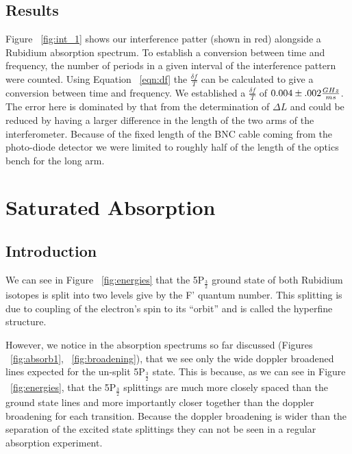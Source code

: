 \documentclass[paper=a4, fontsize=11pt]{scrartcl} %
\numberwithin{equation}{section}
\numberwithin{figure}{section}
\numberwithin{table}{section}
\begin{document}
\subsection{Results}


Figure ~\ref{fig:int_1} shows our interference patter (shown in red)
alongside a Rubidium absorption spectrum. To establish a conversion
between time and frequency, the number of periods in a given interval of
the interference pattern were counted. Using Equation ~\ref{eqn:df}
the $\frac{\delta f}{T}$ can be calculated to give a conversion
between time and frequency. We established a $\frac{\delta f}{T}$ of
$0.004 \pm .002\frac{\normalfont{GHz}}{\normalfont{ms}}$. The error
here is dominated by that from the determination of $\Delta L$ and
could be reduced by having a larger difference in the length of the
two arms of the interferometer. Because of the fixed length of the BNC
cable coming from the photo-diode detector we were limited to roughly
half of the length of the optics bench for the long arm.  
\section{Saturated Absorption}

\subsection{Introduction}
\label{sec:satabintro}
We can see in Figure ~\ref{fig:energies} that the 5P$_{\frac{3}{2}}$
ground state of both Rubidium isotopes is split into two levels give by the F' quantum
number. This splitting is due to coupling of the electron's spin to
its ``orbit'' and is called the hyperfine structure. 

However, we notice in the absorption spectrums so far discussed
(Figures ~\ref{fig:absorb1}, ~\ref{fig:broadening}), that we see only
the wide doppler broadened lines expected for the un-split
5P$_{\frac{3}{2}}$ state. This is because, as we can see in Figure
~\ref{fig:energies}, that the 5P$_{\frac{3}{2}}$ splittings are much
more closely spaced than the ground state lines and more importantly
closer together than the doppler broadening for each
transition. Because the doppler broadening is wider than the
separation of the excited state splittings they can not be seen in a
regular absorption experiment.
\end{document}
